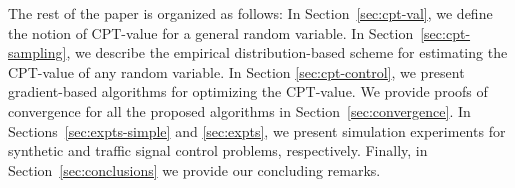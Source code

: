 The rest of the paper is organized as follows: 
In Section~\ref{sec:cpt-val}, we define the notion of CPT-value for a general random variable.
In Section~\ref{sec:cpt-sampling}, we
describe the empirical distribution-based scheme for estimating the CPT-value of any random variable. In Section \ref{sec:cpt-control}, we present gradient-based algorithms for optimizing the CPT-value. 
We provide proofs of convergence for all the proposed algorithms in Section~\ref{sec:convergence}.
In Sections~\ref{sec:expts-simple} and \ref{sec:expts}, we present simulation experiments for synthetic and traffic signal control problems, respectively. Finally, in Section~\ref{sec:conclusions} we provide our concluding remarks.
